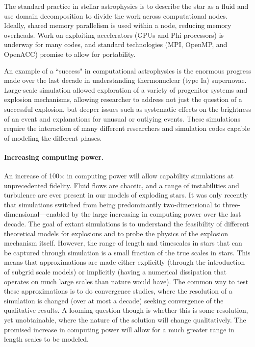 \documentclass[11pt,twocolumn]{article}
\begin{document}
The standard practice in stellar astrophysics is to describe the star
as a fluid and use domain decomposition to divide the work across
computational nodes.  Ideally, shared memory parallelism is used
within a node, reducing memory overheads.  Work on exploiting
accelerators (GPUs and Phi processors) is underway for many codes, and
standard technologies (MPI, OpenMP, and OpenACC) promise to allow for
portability.

An example of a ``success" in computational astrophysics is the
enormous progress made over the last decade in understanding 
thermonuclear (type Ia) supernovae. Large-scale simulation 
allowed exploration of a variety of progenitor systems and
explosion mechanisms, allowing researcher to address not
just the question of a successful explosion, but deeper issues such
as systematic effects on the brightness of an event and explanations
for unusual or outlying events.  These simulations require the
interaction of many different researchers and simulation codes
capable of modeling the different phases.

\paragraph*{Increasing computing power.}

An increase of 100$\times$ in computing power will allow capability
simulations at unprecedented fidelity. Fluid flows are chaotic, and a
range of instabilities and turbulence are ever present in our models
of exploding stars. It was only recently that simulations switched
from being predominantly two-dimensional to
three-dimensional---enabled by the large increasing in computing power
over the last decade.  The goal of extant simulations is to understand
the feasibility of different theoretical models for explosions and to
probe the physics of the explosion mechanism itself.  However, the
range of length and timescales in stars that can be captured through
simulation is a small fraction of the true scales in stars.  This
means that approximations are made either explicitly (through the
introduction of subgrid scale models) or implicitly (having a
numerical dissipation that operates on much large scales than nature
would have).  The common way to test these approximations is to do
convergence studies, where the resolution of a simulation is changed
(over at most a decade) seeking convergence of the qualitative
results.  A looming question though is whether this is some
resolution, yet unobtainable, where the nature of the solution will
change qualitatively.  The promised increase in computing power will
allow for a much greater range in length scales to be modeled.
\end{document}
